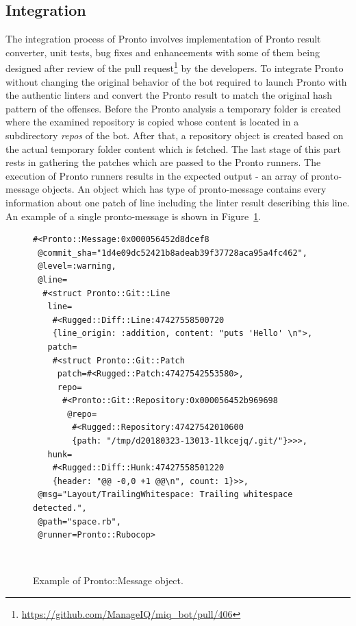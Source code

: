 \subsection{Integration}

The integration process of Pronto involves implementation of Pronto result converter, unit tests, bug fixes and enhancements with some of them being designed after review of the pull request\footnote{\url{https://github.com/ManageIQ/miq_bot/pull/406}} by the developers. To integrate Pronto without changing the original behavior of the bot required to launch Pronto with the authentic linters and convert the Pronto result to match the original hash pattern of the offenses. Before the Pronto analysis a temporary folder is created where the examined repository is copied whose content is located in a subdirectory \textit{repos} of the bot. After that, a repository object is created based on the actual temporary folder content which is fetched. The last stage of this part rests in gathering the patches which are passed to the Pronto runners. The execution of Pronto runners results in the expected output - an array of pronto-message objects. An object which has type of pronto-message contains every information about one patch of line including the linter result describing this line. An example of a single pronto-message is shown in Figure~\ref{fig:pronto_message}.

\begin{figure}[H]
\begin{lstlisting}[basicstyle=\scriptsize, xleftmargin=.21\textwidth]
#<Pronto::Message:0x000056452d8dcef8
 @commit_sha="1d4e09dc52421b8adeab39f37728aca95a4fc462",
 @level=:warning,
 @line=
  #<struct Pronto::Git::Line
   line=
    #<Rugged::Diff::Line:47427558500720
    {line_origin: :addition, content: "puts 'Hello' \n">,
   patch=
    #<struct Pronto::Git::Patch
     patch=#<Rugged::Patch:47427542553580>,
     repo=
      #<Pronto::Git::Repository:0x000056452b969698
       @repo=
        #<Rugged::Repository:47427542010600
        {path: "/tmp/d20180323-13013-1lkcejq/.git/"}>>>,
   hunk=
    #<Rugged::Diff::Hunk:47427558501220
    {header: "@@ -0,0 +1 @@\n", count: 1}>>,
 @msg="Layout/TrailingWhitespace: Trailing whitespace detected.",
 @path="space.rb",
 @runner=Pronto::Rubocop>
\end{lstlisting}
\hfill\\[-3em]
\caption{Example of Pronto::Message object.}
\label{fig:pronto_message}
\end{figure}

